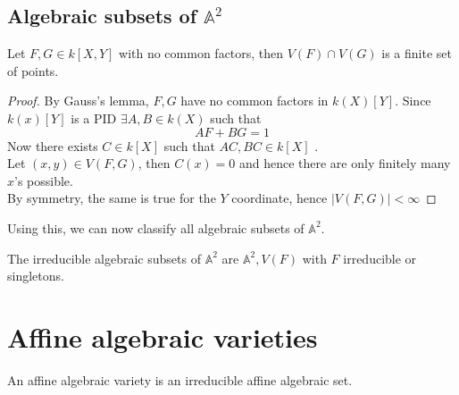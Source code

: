 \documentclass[../main.tex]{subfiles}
\begin{document}
\subsection{Algebraic subsets of $ \mathbb{A}^{2}$ }
\begin{lemma}
	Let $F,G\in k[X,Y]$ with no common factors, then $V( F) \cap V( G) $ is a finite set of points.
\end{lemma}
\begin{proof}
By Gauss's lemma, $F,G$ have no common factors in $k( X) [ Y] $. Since $k( x) [ Y] $ is a PID $\exists A,B\in k( X) $ such that 
\[ 
AF +BG=1
\]
Now there exists $C\in k[X]$ such that $AC,BC\in k[X]$ .\\
Let $( x,y) \in V( F,G) $, then $C( x) =0$ and hence there are only finitely many $x$'s possible.\\
By symmetry, the same is true for the $Y$ coordinate, hence $ |V( F,G) | < \infty $ 
\end{proof}
Using this,  we can now classify all algebraic subsets of $ \mathbb{A}^{2}$.
\begin{crly}
The irreducible algebraic subsets of $ \mathbb{A}^{2}$ are $ \mathbb{A}^{2}, V( F) $ with $F$ irreducible or singletons.
\end{crly}
\section{Affine algebraic varieties}
\begin{defn}
	An affine algebraic variety is an irreducible affine algebraic set.
\end{defn}
\end{document}
